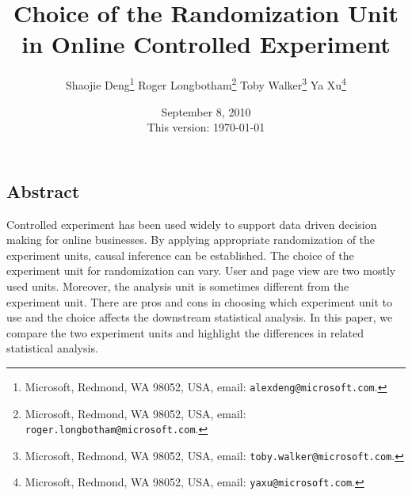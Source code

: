 \documentclass[10pt]{article}
\begin{document}
\date{}

\title{\Large\bf Choice of the Randomization Unit in Online Controlled Experiment}


\author{Shaojie Deng\footnote{Microsoft, Redmond, WA 98052, USA, email: {\tt alexdeng@microsoft.com}.}\;\;\;\; Roger Longbotham\footnote{Microsoft, Redmond, WA 98052, USA, email: {\tt roger.longbotham@microsoft.com}.}\;\;\;\; Toby Walker\footnote{Microsoft, Redmond, WA 98052, USA, email: {\tt toby.walker@microsoft.com}.}\;\;\;\; Ya Xu\footnote{Microsoft, Redmond, WA 98052, USA, email: {\tt yaxu@microsoft.com}.} } \normalsize

\date{September 8, 2010\\ This version: \today}
\maketitle

\thispagestyle{empty}

\subsection*{Abstract}
Controlled experiment has been used widely to support data driven decision making for online businesses. By applying appropriate randomization of the experiment units, causal inference can be established. The choice of the experiment unit for randomization can vary. User and page view are two mostly used units. Moreover, the analysis unit is sometimes different from the experiment unit. There are pros and cons in choosing which experiment unit to use and the choice affects the downstream statistical analysis. In this paper, we compare the two experiment units and highlight the differences in related statistical analysis.     
\end{document}
